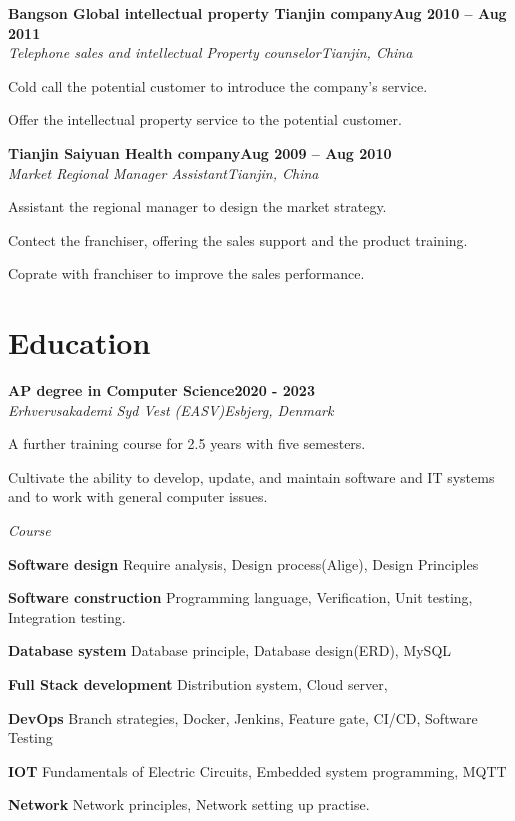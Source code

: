 \documentclass[a4paper]{article}
\newcommand{\heading}[2]{
\hspace{10pt}#1\hfill#2\\
}
\newcommand{\headingBf}[2]{
\heading{\textbf{#1}}{\textbf{#2}}
}
\newcommand{\headingIt}[2]{
\heading{\textit{#1}}{\textit{#2}}
}
\newenvironment{resume_list}{
\vspace{-7pt}
\begin{itemize}[itemsep=-2px, parsep=1pt, leftmargin=30pt]
}{
\end{itemize}
}
\begin{document}
\headingBf{Bangson Global intellectual property Tianjin company}{Aug 2010 -- Aug 2011}
\headingIt{Telephone sales and intellectual Property counselor}{Tianjin, China}
\begin{resume_list}
\item Cold call the potential customer to introduce the company's service.
\item Offer the intellectual property service to the potential customer.
\end{resume_list}

\headingBf{Tianjin Saiyuan Health company}{Aug 2009 -- Aug 2010}
\headingIt{Market Regional Manager Assistant}{Tianjin, China}
\begin{resume_list}
\item Assistant the regional manager to design the market strategy.
\item Contect the franchiser, offering the sales support and the product training.
\item Coprate with franchiser to improve the sales performance.
\end{resume_list}



\vspace{2em}
\section{Education}

\headingBf{AP degree in Computer Science}{2020 - 2023}
\headingIt{Erhvervsakademi Syd Vest (EASV)}{Esbjerg, Denmark} %
\begin{resume_list}
\item A further training course for 2.5 years with five semesters. 
\item Cultivate the ability to develop, update, and maintain software and IT systems and to work with general computer issues.
\end{resume_list}

\headingIt{Course}{}
\begin{resume_list}
	\item {\bf Software design} {\hfill Require analysis, Design process(Alige), Design Principles}
	\item {\bf Software construction}  {\hfill Programming language, Verification, Unit testing, Integration testing.}
	\item {\bf Database system} {\hfill Database principle, Database design(ERD), MySQL}
	\item {\bf Full Stack development} {\hfill Distribution system, Cloud server, }
	\item {\bf DevOps} {\hfill Branch strategies, Docker, Jenkins, Feature gate, CI/CD, Software Testing}
	\item {\bf IOT} {\hfill Fundamentals of Electric Circuits, Embedded system programming, MQTT}
	\item {\bf Network} {\hfill Network principles, Network setting up practise}.
\end{resume_list}
\end{document}
